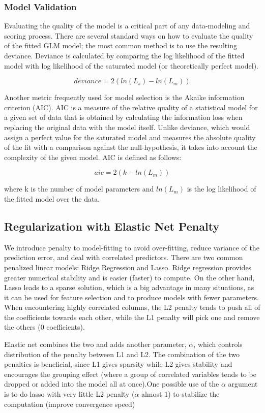 \documentclass[11pt]{article}
\begin{document}
\subsubsection{Model Validation}
Evaluating the quality of the model is a critical part of any data-modeling and scoring process. There are several standard ways on how to evaluate the quality of the fitted GLM model; the most common method is to use the resulting deviance. Deviance is calculated by comparing the log likelihood of the fitted model with log likelihood of the saturated model (or theoretically perfect model).

\[ deviance = 2({ln(L_{s})} - {ln(L_{m})}) \]

Another metric frequently used for model selection is the Akaike information criterion (AIC). AIC is a measure of the relative quality of a statistical model for a given set of data that is obtained by calculating the information loss when replacing the original data with the model itself. Unlike deviance, which would assign a perfect value for the saturated model and measures the absolute quality of the fit with a comparison against the null-hypothesis, it takes into account the complexity of the given model. AIC is defined as follows:

\[ aic = 2(k - ln(L_{m}))\]

\noindent
where k is the number of model parameters and $ln(L_{m})$ is the log likelihood of the fitted model over the data.

\subsection{Regularization with Elastic Net Penalty} 
We introduce penalty to model-fitting to avoid over-fitting, reduce variance of the prediction error, and deal with correlated predictors. There are two common penalized linear models: Ridge Regression and Lasso. Ridge regression provides greater numerical stability and is easier (faster) to compute. On the other hand, Lasso leads to a sparse solution, which is a big advantage in many situations, as it can be used for feature selection and to produce models with fewer parameters. When encountering highly correlated columns, the L2 penalty tends to push all of the coefficients towards each other, while the L1 penalty will pick one and remove the others (0 coefficients).

Elastic net combines the two and adds another parameter, $\alpha$, which controls distribution of the penalty between L1 and L2. The combination of the two penalties is beneficial, since L1 gives sparsity while L2 gives stability and encourages the grouping effect (where a group of correlated variables tends to be dropped or added into the model all at once).One possible use of the $\alpha$ argument is to do lasso with very little L2 penalty ($\alpha$ almost 1) to stabilize the computation (improve convergence speed)
\end{document}
